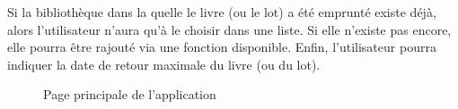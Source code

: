 Si la bibliothèque dans la quelle le livre (ou le lot) a été emprunté existe déjà, 
alors l'utilisateur n'aura qu'à le choisir dans une liste. Si elle n'existe pas encore, elle pourra être rajouté via une fonction disponible. 
Enfin, l'utilisateur pourra indiquer la date de retour maximale du livre (ou du lot).
\begin{figure}[htbp]
  \begin{center}
    \leavevmode
    \hspace{2cm}
    \caption{Page principale de l'application}
  \end{center}
\end{figure}

